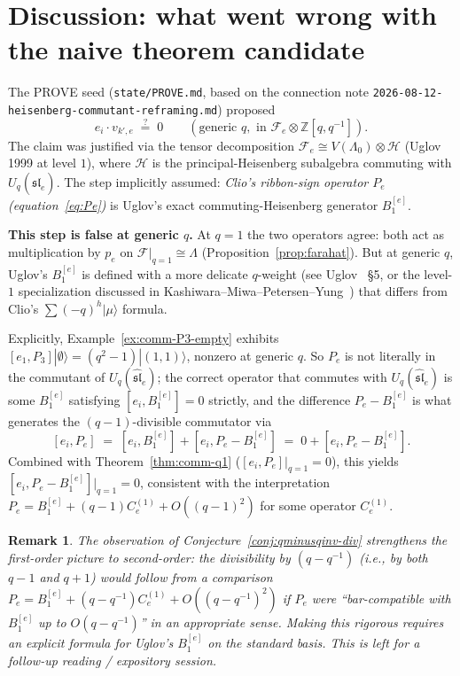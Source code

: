 \documentclass[11pt]{article}
\newtheorem{remark}[theorem]{Remark}
\theoremstyle{definition}
\newcommand{\Fock}{\mathcal{F}}
\newcommand{\Uq}{U_q(\widehat{\mathfrak{sl}}_e)}
\newcommand{\Lam}{\Lambda_0}
\newcommand{\Heis}{\mathcal{H}}
\newcommand{\vke}{v_{k',e}}
\begin{document}
\section{Discussion: what went wrong with the naive theorem candidate}

The PROVE seed (\texttt{state/PROVE.md}, based on the connection note
\texttt{2026-08-12-heisenberg-commutant-reframing.md}) proposed
\begin{equation} \label{eq:falseclaim}
    e_i \cdot \vke \;\overset{?}{=}\; 0 \qquad (\text{generic } q, \text{ in } \Fock_e \otimes \mathbb{Z}[q, q^{-1}]).
\end{equation}
The claim was justified via the tensor decomposition
$\Fock_e \cong V(\Lam) \otimes \Heis$ (Uglov 1999 at level $1$), where $\Heis$ is the
principal-Heisenberg subalgebra commuting with $\Uq$. The step implicitly
assumed: \emph{Clio's ribbon-sign operator $P_e$ (equation~\eqref{eq:Pe})} is
Uglov's exact commuting-Heisenberg generator $B_1^{[e]}$.

\textbf{This step is false at generic $q$.} At $q = 1$ the two operators agree:
both act as multiplication by $p_e$ on $\Fock|_{q=1} \cong \Lambda$
(Proposition~\ref{prop:farahat}). But at generic $q$, Uglov's $B_1^{[e]}$ is
defined with a more delicate $q$-weight (see Uglov~\cite{Uglov} \S5, or the
level-$1$ specialization discussed in Kashiwara--Miwa--Petersen--Yung~\cite{KMPY})
that differs from Clio's $\sum (-q)^h |\mu\rangle$ formula.

Explicitly, Example~\ref{ex:comm-P3-empty} exhibits
$[e_1, P_3]|\emptyset\rangle = (q^2 - 1)|(1,1)\rangle$, nonzero at generic $q$.
So $P_e$ is not literally in the commutant of $\Uq$; the correct operator that
commutes with $\Uq$ is some $B_1^{[e]}$ satisfying $[e_i, B_1^{[e]}] = 0$
strictly, and the difference $P_e - B_1^{[e]}$ is what generates the
$(q-1)$-divisible commutator via
\[
    [e_i, P_e] \;=\; [e_i, B_1^{[e]}] + [e_i, P_e - B_1^{[e]}] \;=\; 0 + [e_i, P_e - B_1^{[e]}].
\]
Combined with Theorem~\ref{thm:comm-q1} ($[e_i, P_e]|_{q=1} = 0$), this yields
$[e_i, P_e - B_1^{[e]}]|_{q=1} = 0$, consistent with the interpretation
$P_e = B_1^{[e]} + (q-1) C_e^{(1)} + O((q-1)^2)$ for some operator $C_e^{(1)}$.

\begin{remark} \label{rem:P-vs-B}
The observation of Conjecture~\ref{conj:qminusqinv-div} strengthens the
first-order picture to second-order: the divisibility by $(q - q^{-1})$ (i.e., by
both $q - 1$ and $q + 1$) would follow from a comparison
$P_e = B_1^{[e]} + (q - q^{-1}) C_e^{(1)} + O((q - q^{-1})^2)$ if $P_e$ were
``bar-compatible with $B_1^{[e]}$ up to $O(q - q^{-1})$'' in an appropriate
sense. Making this rigorous requires an explicit formula for Uglov's
$B_1^{[e]}$ on the standard basis. This is left for a follow-up reading /
expository session.
\end{remark}
\end{document}
